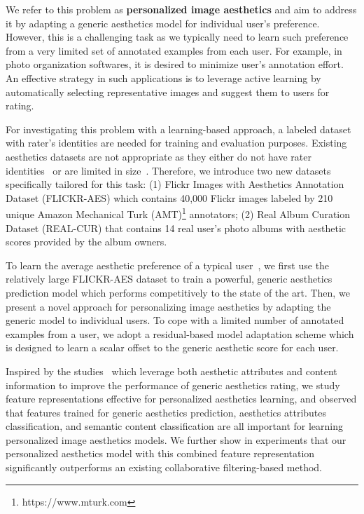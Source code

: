 We refer to this problem as \textbf{personalized image aesthetics} and aim to address it by adapting a generic aesthetics model for individual user's preference. However, this is a challenging task as we typically need to learn such preference from a very limited set of annotated examples from each user. For example, in photo organization softwares, it is desired to minimize user's annotation effort. An effective strategy in such applications is to leverage active learning by automatically selecting representative images and suggest them to users for rating.

For investigating this problem with a learning-based approach, a labeled dataset with rater's identities are needed for training and evaluation purposes. Existing aesthetics datasets are not appropriate as they either do not have rater identities~\cite{murray2012ava} or are limited in size~\cite{kang2014convolutional}. Therefore, we introduce two new datasets specifically tailored for this task: (1) Flickr Images with Aesthetics Annotation Dataset (FLICKR-AES) which contains 40,000 Flickr images labeled by 210 unique Amazon Mechanical Turk (AMT)\footnote{https://www.mturk.com} annotators; (2) Real Album Curation Dataset (REAL-CUR) that contains 14 real user's photo albums with aesthetic scores provided by the album owners. 

To learn the average aesthetic preference of a typical user~\cite{bronstad2007beauty, kaplan1989experience}, we first use the relatively large FLICKR-AES dataset to train a powerful, generic aesthetics prediction model which performs competitively to the state of the art. Then, we present a novel approach for personalizing image aesthetics by adapting the generic model to individual users. To cope with a limited number of annotated examples from a user, we adopt a residual-based model adaptation scheme which is designed to learn a scalar offset to the generic aesthetic score for each user. 

Inspired by the studies~\cite{dhar2011high, luo2011content, murray2012ava} which leverage both aesthetic attributes and content information to improve the performance of generic aesthetics rating, we study feature representations effective for personalized aesthetics learning, and observed that features trained for generic aesthetics prediction, aesthetics attributes classification, and semantic content classification are all important for learning personalized image aesthetics models. We further show in experiments that our personalized aesthetics model with this combined feature representation significantly outperforms an existing collaborative filtering-based method.

